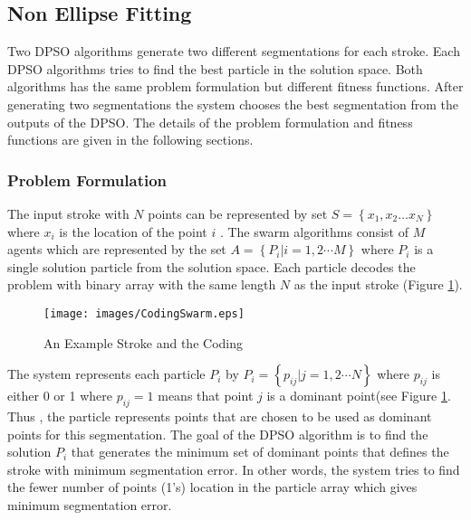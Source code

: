\subsection{Non Ellipse Fitting}
\label{sec:SwarmSegmentation}
Two DPSO algorithms generate two different segmentations for each stroke. Each DPSO algorithms tries to find the best particle in the solution space. Both algorithms has the same problem formulation but different fitness functions. After generating two segmentations the system chooses the best segmentation from the outputs of the DPSO. The details of the problem formulation and fitness functions are given in the following sections.
\subsubsection{Problem Formulation}
\label{sec:ProblemFormulation}
The input stroke with $N$ points can be represented by set $S = \left\{ {x_1 ,x_2  \ldots x_N } \right\}$ where $x_i$ is the location of the point $i$ . The swarm algorithms consist of $M$ agents which are represented by the set 
$A  = \left\{ {P_i \left| {i = 1,2 \cdots M} \right.} \right\}$ where $P_i$ is a single solution particle from the solution space. Each particle decodes the problem with binary array with the same length $N$ as the input stroke (Figure \ref{fig:CodingSwarm}).   
\begin{figure}
	\centering
		\texttt{[image: images/CodingSwarm.eps]}
	\caption{An Example Stroke and the Coding}
	\label{fig:CodingSwarm}
\end{figure}
The system represents each particle $P_i$ by $P_i = \left\{ {p_{ij} \left| {j = 1,2 \cdots N} \right.} \right\}$ where $p_{ij}$ is either 0 or 1 where $p_{ij}=1$ means that point $j$ is a dominant point(see Figure \ref{fig:CodingSwarm}.  Thus , the particle represents points that are chosen to be used as dominant points for this segmentation. 
The goal of the DPSO algorithm is to find the solution $P_i$ that generates the minimum set of dominant points that defines the stroke with minimum segmentation error. In other words, the system tries to find the fewer number of points (1's) location in the particle array which gives minimum segmentation error.  


